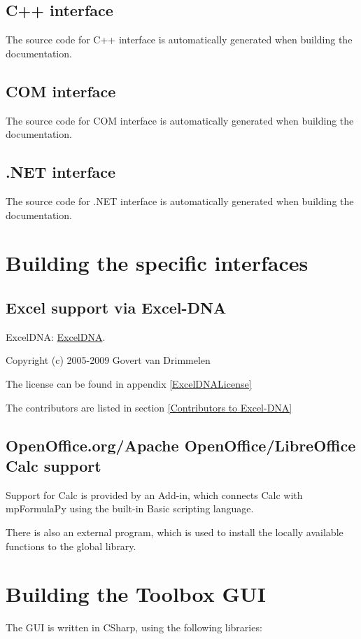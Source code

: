 \subsection{C++ interface}
The source code for C++ interface is automatically generated when building the documentation.



\subsection{COM interface}
The source code for COM interface is automatically generated when building the documentation.


\subsection{.NET interface}
The source code for .NET interface is automatically generated when building the documentation.


\newpage
\section{Building the specific interfaces}


\subsection{Excel support via Excel-DNA}
ExcelDNA: \href{http://exceldna.codeplex.com/}{ExcelDNA}.

Copyright (c) 2005-2009 Govert van Drimmelen

The license can be found in appendix \ref{ExcelDNALicense}

The contributors are listed in section \ref{Contributors to Excel-DNA}




\subsection{OpenOffice.org/Apache OpenOffice/LibreOffice Calc support}

Support for Calc is provided by an Add-in, which connects Calc with mpFormulaPy using the built-in Basic scripting language.

There is also an external program, which is used to install the locally available functions to the global library.




\section{Building the Toolbox GUI}
The GUI is written in CSharp, using the following libraries:



